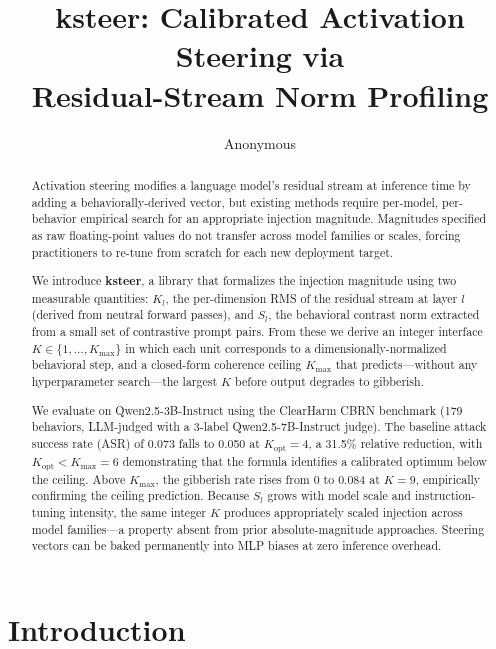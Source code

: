 \documentclass[10pt]{article}
\title{\textbf{ksteer}: Calibrated Activation Steering via\\
       Residual-Stream Norm Profiling}
\author[1]{Anonymous}
\affil[1]{Anonymous Institution}
\date{}
\begin{document}
\maketitle

\begin{abstract}
Activation steering modifies a language model's residual stream at
inference time by adding a behaviorally-derived vector, but existing
methods require per-model, per-behavior empirical search for an
appropriate injection magnitude.  Magnitudes specified as raw floating-point
values do not transfer across model families or scales, forcing practitioners
to re-tune from scratch for each new deployment target.

We introduce \textbf{ksteer}, a library that formalizes the injection
magnitude using two measurable quantities: $K_l$, the per-dimension RMS of
the residual stream at layer $l$ (derived from neutral forward passes), and
$S_l$, the behavioral contrast norm extracted from a small set of contrastive
prompt pairs.  From these we derive an integer interface $K \in \{1, \ldots,
K_\text{max}\}$ in which each unit corresponds to a dimensionally-normalized
behavioral step, and a closed-form coherence ceiling $K_\text{max}$ that
predicts---without any hyperparameter search---the largest $K$ before output
degrades to gibberish.

We evaluate on Qwen2.5-3B-Instruct using the ClearHarm CBRN benchmark
(179 behaviors, LLM-judged with a 3-label Qwen2.5-7B-Instruct judge).
The baseline attack success rate (ASR) of 0.073 falls to 0.050 at
$K_\text{opt} = 4$, a 31.5\% relative reduction, with $K_\text{opt} < K_\text{max} = 6$
demonstrating that the formula identifies a calibrated optimum below the ceiling.
Above $K_\text{max}$, the gibberish rate rises from 0 to 0.084 at $K = 9$,
empirically confirming the ceiling prediction.  Because $S_l$ grows with model
scale and instruction-tuning intensity, the same integer $K$ produces
appropriately scaled injection across model families---a property absent from
prior absolute-magnitude approaches.  Steering vectors can be baked
permanently into MLP biases at zero inference overhead.
\end{abstract}

\section{Introduction}
\label{sec:intro}
\end{document}
